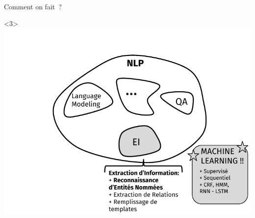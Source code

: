 \documentclass[10pt]{beamer}
\begin{document}
\begin{frame}{Comment on fait~?}
	\begin{onlyenv}\vspace*{\fill}\includegraphics[width=1\linewidth]{"img/nlp_diag3"}\vspace*{\fill}\end{onlyenv}
\end{frame}
\end{document}
